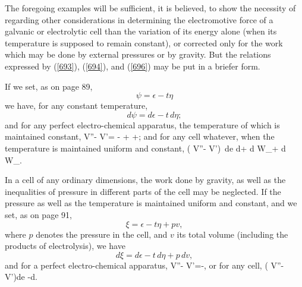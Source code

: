 \documentclass[12pt]{article}
\begin{document}
The foregoing examples will be sufficient, it is believed, to show the necessity of regarding other considerations in determining the electromotive force of a galvanic or electrolytic cell than the variation of its energy alone (when its temperature is supposed to remain constant), or corrected only for the work which may be done by external pressures or by gravity. But the relations expressed by (\ref{693}), (\ref{694}), and (\ref{696}) may be put in a briefer form.

If we set, as on page 89,
$$ \psi = \epsilon -t\eta $$
we have, for any constant temperature,
$$ d\psi = d\epsilon - t \, d\eta ;$$
and for any perfect electro-chemical apparatus, the temperature of which is maintained constant,
\eqs V''- V'= - +  +; \label{697} \eqe
and for any cell whatever, when the temperature is maintained uniform and constant,
\eqs ( V''- V')\, de \leq d\psi + d W_+ d W_.  \label{698} \eqe

In a cell of any ordinary dimensions, the work done by gravity, as well as the inequalities of pressure in different parts of the cell may be neglected. If the pressure as well as the temperature is maintained uniform and constant, and we set, as on page 91,
$$ \xi=\epsilon-t\eta +pv,$$
where $p$ denotes the pressure in the cell, and $v$ its total volume (including the products of electrolysis), we have
$$ d\xi=d\epsilon-t\,d\eta +p\, dv,$$
and for a perfect electro-chemical apparatus,
\eqs V''- V'=-,   \label{699} \eqe
or for any cell,
\eqs ( V''- V')de \leq -d\xi.    \label{700} \eqe
\end{document}
